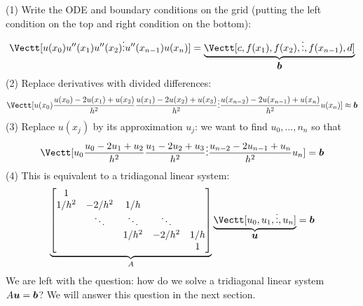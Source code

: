 (1) Write the ODE and boundary conditions on the grid (putting the left condition on the top and right condition on the bottom):
\[
\Vectt[u(x_0) \\ 
u''(x_1) \\
u''(x_2) \\
\ensuremath{\vdots} \\
u''(x_{n-1}) \\
u(x_n)] = \underbrace{\Vectt[c, f(x_1), f(x_2), \ensuremath{\vdots} , f(x_{n-1}), d]}_{\ensuremath{\bm{\b}}}
\]
(2) Replace derivatives with divided differences:
\[
\Vectt[u(x_0) \\ 
{u(x_0) - 2u(x_1) + u(x_2)\over h^2} \\
{u(x_1) - 2u(x_2) + u(x_3)\over h^2} \\
\ensuremath{\vdots} \\
{u(x_{n-2}) - 2u(x_{n-1}) + u(x_n)\over h^2} \\
u(x_n)] \ensuremath{\approx} \ensuremath{\bm{\b}}
\]
(3) Replace $u(x_j)$  by its approximation $u_j$: we want to find $u_0,\ensuremath{\ldots},n_n$ so that
\[
\Vectt[u_0 \\ 
{u_0 - 2u_1 + u_2\over h^2} \\
{u_1 - 2u_2 + u_3\over h^2} \\
\ensuremath{\vdots} \\
{u_{n-2} - 2u_{n-1} + u_n\over h^2} \\
u_n] = \ensuremath{\bm{\b}}
\]
(4) This is equivalent to a tridiagonal linear system:
\[
\underbrace{\begin{bmatrix}
    1 \\ 
    1/h^2 & -2/h^2 & 1/h \\
    & \ensuremath{\ddots} & \ensuremath{\ddots} & \ensuremath{\ddots} \\
   && 1/h^2 & -2/h^2 & 1/h \\ 
   &&&& 1 \end{bmatrix}}_A \underbrace{\Vectt[u_0,u_1,\ensuremath{\vdots},u_n]}_{\ensuremath{\bm{\u}}} = \ensuremath{\bm{\b}}
\]
We are left with the question: how do we solve a tridiagonal linear system $A \bm{{\mbox{\boldmath$u$\unboldmath}}} = \bm{{\mbox{\boldmath$b$\unboldmath}}}$? We will answer this question in the next section.



